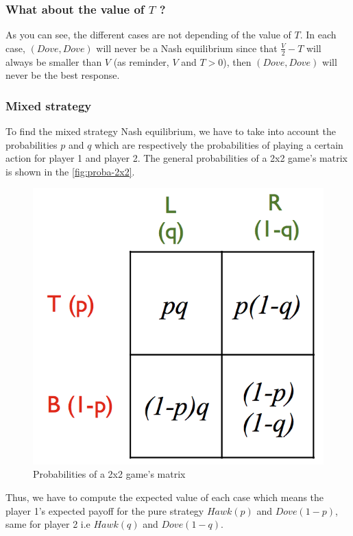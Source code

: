 \documentclass{article}
\begin{document}
\subsubsection{What about the value of $T$ ?}
As you can see, the different cases are not depending of the value of $T$. In each case, $(Dove, Dove)$ will never be a Nash equilibrium since that $\frac{V}{2}-T$ will always be smaller than $V$ (as reminder, $V$ and $T > 0$), then $(Dove,Dove)$ will never be the best response.  

\subsubsection{Mixed strategy} \label{sec:mixedStrat}
To find the mixed strategy Nash equilibrium, we have to take into account the probabilities $p$ and $q$ which are respectively the probabilities of playing a certain action for player 1 and player 2. The general probabilities of a 2x2 game's matrix is shown in the \autoref{fig:proba-2x2}. 

\begin{figure}[h]
  \centering
  \includegraphics[scale=0.35]{figures/proba-2x2.png}
  \caption{Probabilities of a 2x2 game's matrix}
  \label{fig:proba-2x2}
\end{figure}

Thus, we have to compute the expected value of each case which means the player 1’s expected payoff for the pure strategy $Hawk(p)$ and $Dove(1-p)$, same for player 2 i.e $Hawk(q)$ and $Dove(1-q)$.
\end{document}
